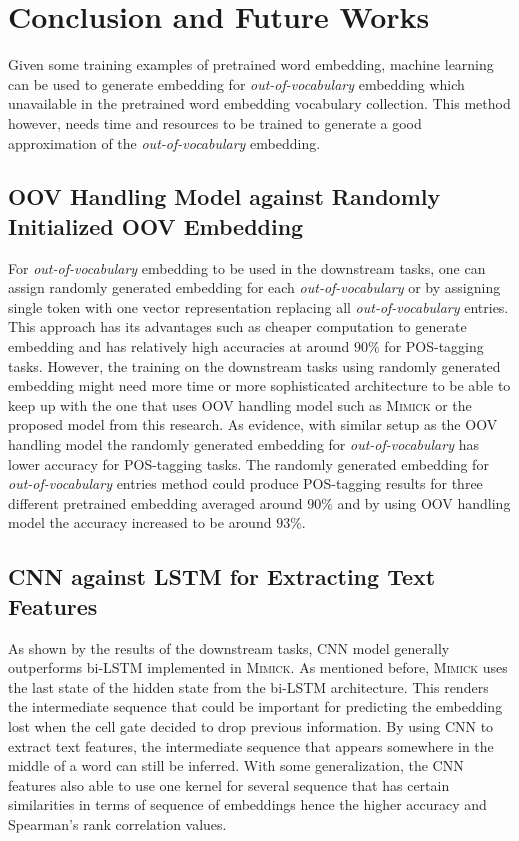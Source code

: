 \chapter{Conclusion and Future Works}
\label{chap:conc}

Given some training examples of pretrained word embedding, machine
learning can be used to generate embedding for
\textit{out-of-vocabulary} embedding which unavailable in the
pretrained word embedding vocabulary collection. This method however,
needs time and resources to be trained to generate a good
approximation of the \textit{out-of-vocabulary} embedding.

\section{OOV Handling Model against Randomly Initialized OOV Embedding}
For \textit{out-of-vocabulary} embedding to be used in the downstream
tasks, one can assign randomly generated embedding for each
\textit{out-of-vocabulary} or by assigning single token with one
vector representation replacing all \textit{out-of-vocabulary}
entries. This approach has its advantages such as cheaper computation
to generate embedding and has relatively high accuracies at around
$90\%$ for POS-tagging tasks. However, the training on the downstream
tasks using randomly generated embedding might need more time or more
sophisticated architecture to be able to keep up with the one that
uses OOV handling model such as \textsc{Mimick} or the proposed model
from this research. As evidence, with similar setup as the OOV
handling model the randomly generated embedding for
\textit{out-of-vocabulary} has lower accuracy for POS-tagging tasks.
The randomly generated embedding for \textit{out-of-vocabulary}
entries method could produce POS-tagging results for three different
pretrained embedding averaged around $90\%$ and by using OOV handling
model the accuracy increased to be around $93\%$.

\section{CNN against LSTM for Extracting Text Features}
As shown by the results of the downstream tasks, CNN model generally
outperforms bi-LSTM implemented in \textsc{Mimick}. As mentioned before,
\textsc{Mimick} uses the last state of the hidden state from the
bi-LSTM architecture. This renders the intermediate sequence that
could be important for predicting the embedding lost when the cell
gate decided to drop previous information. By using CNN to extract
text features, the intermediate sequence that appears somewhere in the
middle of a word can still be inferred. With some generalization, the
CNN features also able to use one kernel for several sequence that has
certain similarities in terms of sequence of embeddings hence the
higher accuracy and Spearman's rank correlation values.

